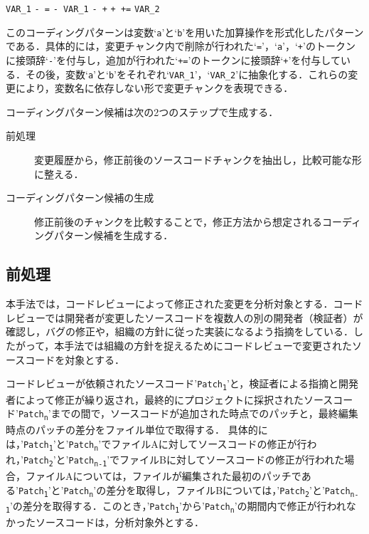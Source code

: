 \documentclass[submit,techrep,noauthor]{ipsj}
\newcommand{\todo}[1]{\colorbox{yellow}{{\bf TODO}:}{\color{red} {\textbf{[#1]}}}}
\begin{document}
\colorbox{lightgray!50}{\texttt{VAR\_1}} \colorbox{lightgray!50}{\texttt{- =}} \colorbox{lightgray!50}{\texttt{- VAR\_1}} \colorbox{lightgray!50}{\texttt{- +}} \colorbox{lightgray!50}{\texttt{+ +=}} \colorbox{lightgray!50}{\texttt{VAR\_2}}

このコーディングパターンは変数`\texttt{a}'と`\texttt{b}'を用いた加算操作を形式化したパターンである．具体的には，変更チャンク内で削除が行われた`\texttt{=}'，`\texttt{a}'，`\texttt{+}'のトークンに接頭辞`\texttt{-}'を付与し，追加が行われた`\texttt{+=}'のトークンに接頭辞`\texttt{+}'を付与している．その後，変数`\texttt{a}'と`\texttt{b}'をそれぞれ`\texttt{VAR\_1}'，`\texttt{VAR\_2}'に抽象化する．これらの変更により，変数名に依存しない形で変更チャンクを表現できる．

コーディングパターン候補は次の2つのステップで生成する．
\begin{description}
    \item[前処理] 変更履歴から，修正前後のソースコードチャンクを抽出し，比較可能な形に整える．
    \item[コーディングパターン候補の生成] 修正前後のチャンクを比較することで，修正方法から想定されるコーディングパターン候補を生成する．
\end{description}


\subsection{前処理}\label{subsec: pre_process}
本手法では，コードレビューによって修正された変更を分析対象とする．コードレビューでは開発者が変更したソースコードを複数人の別の開発者（検証者）が確認し，バグの修正や，組織の方針に従った実装になるよう指摘をしている．したがって，本手法では組織の方針を捉えるためにコードレビューで変更されたソースコードを対象とする．

コードレビューが依頼されたソースコード'\texttt{Patch\textsubscript{1}}'と，検証者による指摘と開発者によって修正が繰り返され，最終的にプロジェクトに採択されたソースコード'\texttt{Patch\textsubscript{n}}'までの間で，ソースコードが追加された時点でのパッチと，最終編集時点のパッチの差分をファイル単位で取得する．
具体的には，'\texttt{Patch\textsubscript{1}}'と'\texttt{Patch\textsubscript{n}}'でファイルAに対してソースコードの修正が行われ，'\texttt{Patch\textsubscript{2}}'と'\texttt{Patch\textsubscript{n-1}}'でファイルBに対してソースコードの修正が行われた場合，ファイルAについては，ファイルが編集された最初のパッチである'\texttt{Patch\textsubscript{1}}'と'\texttt{Patch\textsubscript{n}}'の差分を取得し，ファイルBについては，'\texttt{Patch\textsubscript{2}}'と'\texttt{Patch\textsubscript{n-1}}'の差分を取得する．このとき，'\texttt{Patch\textsubscript{1}}'から'\texttt{Patch\textsubscript{n}}'の期間内で修正が行われなかったソースコードは，分析対象外とする．
\end{document}
